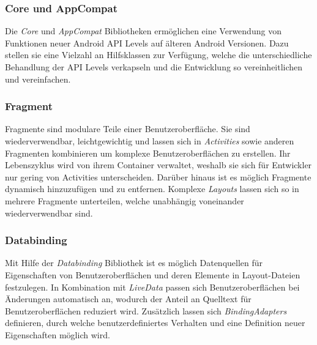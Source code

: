 \documentclass[a4paper, 11pt]{article}
\begin{document}
\subsubsection{Core und AppCompat}
\label{subsubsec:app:jetpack:base}
Die \textit{Core} und \textit{AppCompat} Bibliotheken ermöglichen eine Verwendung von Funktionen neuer Android API Levels auf älteren Android Versionen.
Dazu stellen sie eine Vielzahl an Hilfsklassen zur Verfügung, welche die unterschiedliche Behandlung der API Levels verkapseln und die Entwicklung so vereinheitlichen und vereinfachen.

\subsubsection{Fragment}
\label{subsubsec:app:jetpack:fragment}
Fragmente sind modulare Teile einer Benutzeroberfläche.
Sie sind wiederverwendbar, leichtgewichtig und lassen sich in \textit{Activities} sowie anderen Fragmenten kombinieren um komplexe Benutzeroberflächen zu erstellen.
Ihr Lebenszyklus wird von ihrem Container verwaltet, weshalb sie sich für Entwickler nur gering von Activities unterscheiden.
Darüber hinaus ist es möglich Fragmente dynamisch hinzuzufügen und zu entfernen.
Komplexe \textit{Layouts} lassen sich so in mehrere Fragmente unterteilen, welche unabhängig voneinander wiederverwendbar sind.

\subsubsection{Databinding}
\label{subsubsec:app:jetpack:databinding}
Mit Hilfe der \textit{Databinding} Bibliothek ist es möglich Datenquellen für Eigenschaften von Benutzeroberflächen und deren Elemente in Layout-Dateien festzulegen.
In Kombination mit \textit{LiveData} passen sich Benutzeroberflächen bei Änderungen automatisch an, wodurch der Anteil an Quelltext für Benutzeroberflächen reduziert wird.
Zusätzlich lassen sich \textit{BindingAdapters} definieren, durch welche benutzerdefiniertes Verhalten und eine Definition neuer Eigenschaften möglich wird.
\end{document}
